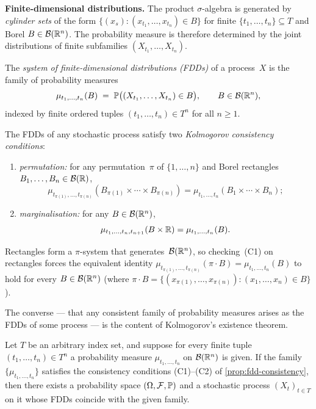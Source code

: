 \medskip
\noindent\textbf{Finite-dimensional distributions.} The product
$\sigma$-algebra is generated by \emph{cylinder sets} of the form
$\{(x_s) : (x_{t_1}, \dots, x_{t_n}) \in B\}$ for finite
$\{t_1, \dots, t_n\} \subseteq T$ and Borel
$B \in \mathcal{B}(\mathbb{R}^n)$. The probability measure is therefore
determined by the joint distributions of finite subfamilies
$(X_{t_1}, \dots, X_{t_n})$.

\begin{definition}
\label{def:fdd}
The \emph{system of finite-dimensional distributions (FDDs)} of a
process~$X$ is the family of probability measures
\[
  \mu_{t_1, \dots, t_n}(B) \;=\; \mathbb{P}\bigl((X_{t_1}, \dots, X_{t_n}) \in B\bigr), \qquad B \in \mathcal{B}(\mathbb{R}^n),
\]
indexed by finite ordered tuples $(t_1, \dots, t_n) \in T^n$ for
all $n \geq 1$.
\end{definition}

\begin{proposition}
\label{prop:fdd-consistency}
The FDDs of any stochastic process satisfy two
\emph{Kolmogorov consistency conditions}:
\begin{enumerate}[label=(C\arabic*)]
  \item \emph{permutation:} for any permutation~$\pi$ of
        $\{1, \dots, n\}$ and Borel rectangles
        $B_1, \dots, B_n \in \mathcal{B}(\mathbb{R})$,
        \[
          \mu_{t_{\pi(1)}, \dots, t_{\pi(n)}}(B_{\pi(1)} \times \cdots \times B_{\pi(n)}) = \mu_{t_1, \dots, t_n}(B_1 \times \cdots \times B_n);
        \]
  \item \emph{marginalisation:} for any
        $B \in \mathcal{B}(\mathbb{R}^n)$,
        \[
          \mu_{t_1, \dots, t_n, t_{n+1}}(B \times \mathbb{R}) = \mu_{t_1, \dots, t_n}(B).
        \]
\end{enumerate}
Rectangles form a $\pi$-system that generates~$\mathcal{B}(\mathbb{R}^n)$, so
checking~(C1) on rectangles forces the equivalent identity
$\mu_{t_{\pi(1)}, \dots, t_{\pi(n)}}(\pi \cdot B) = \mu_{t_1, \dots, t_n}(B)$
to hold for every $B \in \mathcal{B}(\mathbb{R}^n)$ (where
$\pi \cdot B = \{(x_{\pi(1)}, \dots, x_{\pi(n)}) : (x_1, \dots, x_n) \in B\}$).
\end{proposition}

The converse — that any consistent family of probability measures
arises as the FDDs of some process — is the content of Kolmogorov's
existence theorem.

\begin{theorem}
\label{thm:kolmogorov-extension}
Let $T$ be an arbitrary index set, and suppose for every finite
tuple $(t_1, \dots, t_n) \in T^n$ a probability measure
$\mu_{t_1, \dots, t_n}$ on $\mathcal{B}(\mathbb{R}^n)$ is given. If the
family $\{\mu_{t_1, \dots, t_n}\}$ satisfies the consistency
conditions (C1)–(C2) of \cref{prop:fdd-consistency}, then there
exists a probability space $(\Omega, \mathcal{F}, \mathbb{P})$ and a
stochastic process $(X_t)_{t \in T}$ on it whose FDDs coincide
with the given family.
\end{theorem}

